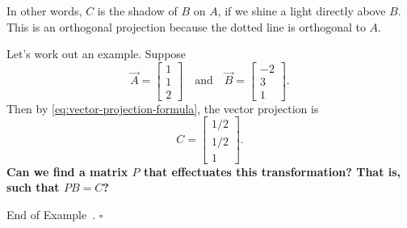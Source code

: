 \documentclass[10pt]{article}
\theoremstyle{definition}
\newtheorem{example}[theorem]{Example}
\renewenvironment{example}
{\begin{oldexample}}
  {\par\smallskip\hfill   End of Example~\theexample. $\square$    \par\end{oldexample}}
\begin{document}
\begin{example}[Projections]
  \begin{center}
  \end{center}
  In other words, $C$ is the shadow of $B$ on $A$, if we shine a light
  directly above $B$. This is an orthogonal projection because the dotted line
  is orthogonal to $A$.

  Let's work out an example. Suppose
  \begin{equation*}
    \vec{A} =
    \begin{bmatrix}
      1\\1\\2
    \end{bmatrix}
    \quad \text{and} \quad
    \vec{B}=
    \begin{bmatrix}
      -2\\3\\1
    \end{bmatrix}.
  \end{equation*}
  Then by \cref{eq:vector-projection-formula}, the vector projection is
  \begin{equation*}
    C =
    \begin{bmatrix}
      1/2\\1/2\\1
    \end{bmatrix}.
  \end{equation*}
  \textbf{Can we find a matrix $P$ that effectuates this transformation? That
    is, such that $PB=C$?}


\end{example}
\end{document}
